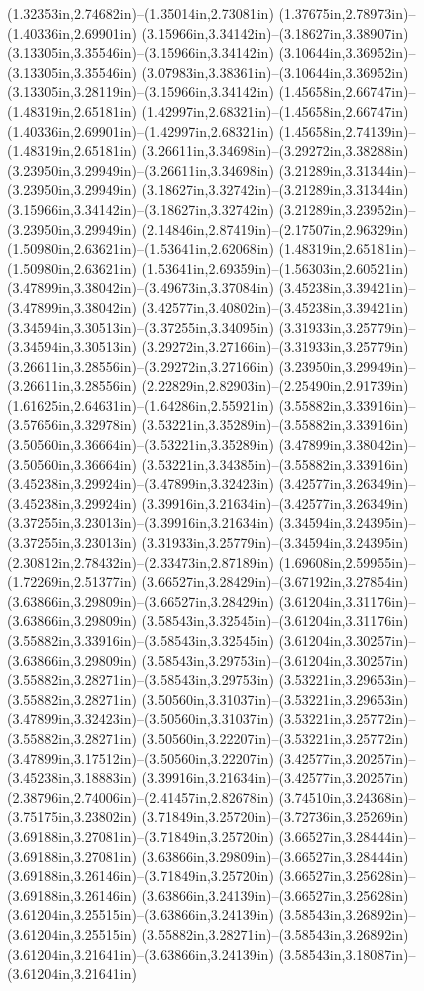 (1.32353in,2.74682in)--(1.35014in,2.73081in) (1.37675in,2.78973in)--(1.40336in,2.69901in) (3.15966in,3.34142in)--(3.18627in,3.38907in) (3.13305in,3.35546in)--(3.15966in,3.34142in) (3.10644in,3.36952in)--(3.13305in,3.35546in) (3.07983in,3.38361in)--(3.10644in,3.36952in) (3.13305in,3.28119in)--(3.15966in,3.34142in) (1.45658in,2.66747in)--(1.48319in,2.65181in) (1.42997in,2.68321in)--(1.45658in,2.66747in) (1.40336in,2.69901in)--(1.42997in,2.68321in) (1.45658in,2.74139in)--(1.48319in,2.65181in) (3.26611in,3.34698in)--(3.29272in,3.38288in) (3.23950in,3.29949in)--(3.26611in,3.34698in) (3.21289in,3.31344in)--(3.23950in,3.29949in) (3.18627in,3.32742in)--(3.21289in,3.31344in) (3.15966in,3.34142in)--(3.18627in,3.32742in) (3.21289in,3.23952in)--(3.23950in,3.29949in) (2.14846in,2.87419in)--(2.17507in,2.96329in) (1.50980in,2.63621in)--(1.53641in,2.62068in) (1.48319in,2.65181in)--(1.50980in,2.63621in) (1.53641in,2.69359in)--(1.56303in,2.60521in) (3.47899in,3.38042in)--(3.49673in,3.37084in) (3.45238in,3.39421in)--(3.47899in,3.38042in) (3.42577in,3.40802in)--(3.45238in,3.39421in) (3.34594in,3.30513in)--(3.37255in,3.34095in) (3.31933in,3.25779in)--(3.34594in,3.30513in) (3.29272in,3.27166in)--(3.31933in,3.25779in) (3.26611in,3.28556in)--(3.29272in,3.27166in) (3.23950in,3.29949in)--(3.26611in,3.28556in) (2.22829in,2.82903in)--(2.25490in,2.91739in) (1.61625in,2.64631in)--(1.64286in,2.55921in) (3.55882in,3.33916in)--(3.57656in,3.32978in) (3.53221in,3.35289in)--(3.55882in,3.33916in) (3.50560in,3.36664in)--(3.53221in,3.35289in) (3.47899in,3.38042in)--(3.50560in,3.36664in) (3.53221in,3.34385in)--(3.55882in,3.33916in) (3.45238in,3.29924in)--(3.47899in,3.32423in) (3.42577in,3.26349in)--(3.45238in,3.29924in) (3.39916in,3.21634in)--(3.42577in,3.26349in) (3.37255in,3.23013in)--(3.39916in,3.21634in) (3.34594in,3.24395in)--(3.37255in,3.23013in) (3.31933in,3.25779in)--(3.34594in,3.24395in) (2.30812in,2.78432in)--(2.33473in,2.87189in) (1.69608in,2.59955in)--(1.72269in,2.51377in) (3.66527in,3.28429in)--(3.67192in,3.27854in) (3.63866in,3.29809in)--(3.66527in,3.28429in) (3.61204in,3.31176in)--(3.63866in,3.29809in) (3.58543in,3.32545in)--(3.61204in,3.31176in) (3.55882in,3.33916in)--(3.58543in,3.32545in) (3.61204in,3.30257in)--(3.63866in,3.29809in) (3.58543in,3.29753in)--(3.61204in,3.30257in) (3.55882in,3.28271in)--(3.58543in,3.29753in) (3.53221in,3.29653in)--(3.55882in,3.28271in) (3.50560in,3.31037in)--(3.53221in,3.29653in) (3.47899in,3.32423in)--(3.50560in,3.31037in) (3.53221in,3.25772in)--(3.55882in,3.28271in) (3.50560in,3.22207in)--(3.53221in,3.25772in) (3.47899in,3.17512in)--(3.50560in,3.22207in) (3.42577in,3.20257in)--(3.45238in,3.18883in) (3.39916in,3.21634in)--(3.42577in,3.20257in) (2.38796in,2.74006in)--(2.41457in,2.82678in) (3.74510in,3.24368in)--(3.75175in,3.23802in) (3.71849in,3.25720in)--(3.72736in,3.25269in) (3.69188in,3.27081in)--(3.71849in,3.25720in) (3.66527in,3.28444in)--(3.69188in,3.27081in) (3.63866in,3.29809in)--(3.66527in,3.28444in) (3.69188in,3.26146in)--(3.71849in,3.25720in) (3.66527in,3.25628in)--(3.69188in,3.26146in) (3.63866in,3.24139in)--(3.66527in,3.25628in) (3.61204in,3.25515in)--(3.63866in,3.24139in) (3.58543in,3.26892in)--(3.61204in,3.25515in) (3.55882in,3.28271in)--(3.58543in,3.26892in) (3.61204in,3.21641in)--(3.63866in,3.24139in) (3.58543in,3.18087in)--(3.61204in,3.21641in) 